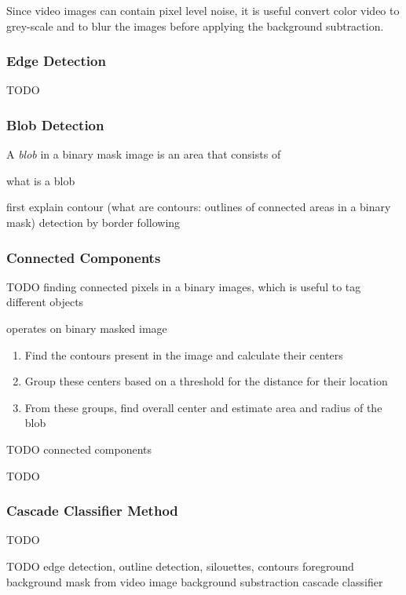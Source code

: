 Since video images can contain pixel level noise, it is useful convert color video to grey-scale and to blur the images before applying the background subtraction.

\subsubsection{Edge Detection}

TODO

\subsubsection{Blob Detection}

A \emph{blob} in a binary mask image is an area that consists of 

what is a blob

first explain contour (what are contours: outlines of connected areas in a binary mask) detection by border following \autocite[][]{suzuki1985border}

\subsubsection{Connected Components}
TODO 
\autocite[][]{he2017connected}
finding connected pixels in a binary images, which is useful to tag different objects


\autocite[][]{opencv2018blob}
operates on binary masked image
\begin{enumerate}
    \item Find the contours present in the image and calculate their centers
    \item Group these centers based on a threshold for the distance for their location
    \item From these groups, find overall center and estimate area and radius of the blob
\end{enumerate}

TODO connected components

TODO

\subsubsection{Cascade Classifier Method}
TODO




TODO
edge detection, outline detection, silouettes, contours
foreground background mask from video image
background substraction
cascade classifier


